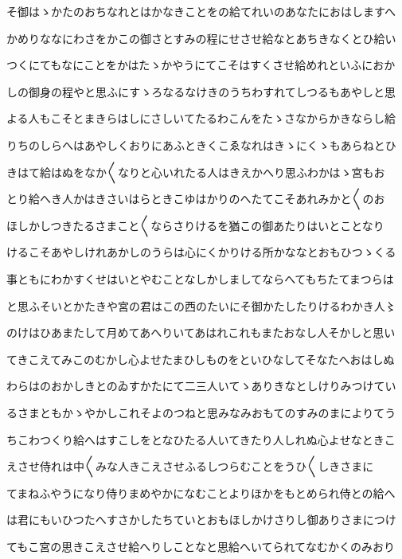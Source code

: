 \documentclass[a4paper,11pt,landscape]{ltjtarticle}
\begin{document}
\par\medskip
そ御はゝかたのおちなれとはかなきことをの給てれいのあなたにおはしますへ
\par\medskip
かめりななにわさをかこの御さとすみの程にせさせ給なとあちきなくとひ給い
\par\medskip
つくにてもなにことをかはたゝかやうにてこそはすくさせ給めれといふにおか
\par\medskip
しの御身の程やと思ふにすゝろなるなけきのうちわすれてしつるもあやしと思
\par\medskip
よる人もこそとまきらはしにさしいてたるわこんをたゝさなからかきならし給
\par\medskip
りちのしらへはあやしくおりにあふときくこゑなれはきゝにくゝもあらねとひ
\par\medskip
きはて給はぬをなか〱なりと心いれたる人はきえかへり思ふわかはゝ宮もお
\par\medskip
とり給へき人かはきさいはらときこゆはかりのへたてこそあれみかと〱のお
\par\medskip
ほしかしつきたるさまこと〱ならさりけるを猶この御あたりはいとことなり
\par\medskip
けるこそあやしけれあかしのうらは心にくかりける所かななとおもひつゝくる
\par\medskip
事ともにわかすくせはいとやむことなしかしましてならへてもちたてまつらは
\par\medskip
と思ふそいとかたきや宮の君はこの西のたいにそ御かたしたりけるわかき人〻
\par\medskip
のけはひあまたして月めてあへりいてあはれこれもまたおなし人そかしと思い
\par\medskip
てきこえてみこのむかし心よせたまひしものをといひなしてそなたへおはしぬ
\par\medskip
わらはのおかしきとのゐすかたにて二三人いてゝありきなとしけりみつけてい
\par\medskip
るさまともかゝやかしこれそよのつねと思みなみおもてのすみのまによりてう
\par\medskip
ちこわつくり給へはすこしをとなひたる人いてきたり人しれぬ心よせなときこ
\par\medskip
えさせ侍れは中〱みな人きこえさせふるしつらむことをうひ〱しきさまに
\par\medskip
てまねふやうになり侍りまめやかになむことよりほかをもとめられ侍との給へ
\par\medskip
は君にもいひつたへすさかしたちていとおもほしかけさりし御ありさまにつけ
\par\medskip
てもこ宮の思きこえさせ給へりしことなと思給へいてられてなむかくのみおり
\par\medskip
\end{document}
